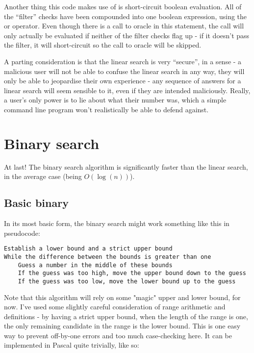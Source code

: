 \documentclass[fleqn,a4paper,11pt]{article}
\begin{document}
    Another thing this code makes use of is short-circuit boolean evaluation.
    All of the ``filter'' checks have been compounded into one boolean
    expression, using the or operator. Even though there is a call to oracle in
    this statement, the call will only actually be evaluated if neither of the
    filter checks flag up - if it doesn't pass the filter, it will short-circuit
    so the call to oracle will be skipped.

    A parting consideration is that the linear search is very ``secure'', in a
    sense - a malicious user will not be able to confuse the linear search in
    any way, they will only be able to jeopardise their own experience - any
    sequence of answers for a linear search will seem sensible to it, even if
    they are intended maliciously. Really, a user's only power is to lie about
    what their number was, which a simple command line program won't
    realistically be able to defend against.

    \section{Binary search}

    At last! The binary search algorithm is significantly faster than the
    linear search, in the average case (being \(O(\log(n))\)).

    \subsection{Basic binary}

    In its most basic form, the binary search might work something like this in
    pseudocode:

\begin{lstlisting}[caption=Basic binary search pseudocode]
Establish a lower bound and a strict upper bound
While the difference between the bounds is greater than one
    Guess a number in the middle of these bounds
    If the guess was too high, move the upper bound down to the guess
    If the guess was too low, move the lower bound up to the guess
\end{lstlisting}

    Note that this algorithm will rely on some "magic" upper and lower bound,
    for now. I've used some slightly careful consideration of range arithmetic
    and definitions - by having a strict upper bound, when the length of the
    range is one, the only remaining candidate in the range is the lower bound.
    This is one easy way to prevent off-by-one errors and too much
    case-checking here. It can be implemented in Pascal quite trivially, like
    so:
\end{document}
